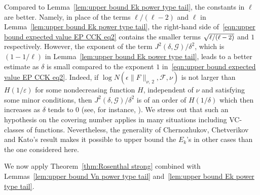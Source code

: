\documentclass[10pt]{amsart}
\theoremstyle{definition}\newtheorem{defi}[theo]{Definition}\newtheorem{rema}[theo]{Remark}\newtheorem{exam}[theo]{Example}\newtheorem{exem}[theo]{Example}\newtheorem{nota}[theo]{Notation}
\newcommand{\cG}{\mathcal{G}}
\newcommand{\caF}{\mathscr{F}}
\begin{document}
Compared to Lemma~\ref{lem:upper bound Ek power type tail}, the constants in $\ell$ are better. Namely, in place of the terms $\ell/(\ell-2)$ and $\ell$ in Lemma~\ref{lem:upper bound Ek power type tail}, the right-hand side of~\eqref{eqn:upper bound expected value EP CCK eq2} contains the smaller terms $\sqrt{\text{\small{$\ell/(\ell-2)$}}}$ and $1$ respectively. However, the exponent of the term $J^2(\delta,\cG)/\delta^2$, which is $(1-1/\ell)$ in Lemma~\ref{lem:upper bound Ek power type tail}, leads to a better estimate as $\delta$ is small compared to the exponent $1$ in~\eqref{eqn:upper bound expected value EP CCK eq2}. Indeed, if $\log N(\epsilon\|F\|_{\nu,\,2},\caF, \nu)$ is not larger than $H(1/\varepsilon)$ for some nondecreasing function $H$, independent of $\nu$ and satisfying some minor conditions, then $J^2(\delta,\cG)/\delta^2$ is of an order of $H(1/\delta)$ which then increases as $\delta$ tends to $0$ (see, for instance, \cite[Theorem~3.5.6]{GN16}). We stress out that such an hypothesis on the covering number applies in many situations including VC-classes of functions. Nevertheless, the generality of Chernozhukov, Chetverikov and Kato's result makes it possible to upper bound the $E_k$'s in other cases than the one considered here.

We now apply Theorem~\ref{thm:Rosenthal strong} combined with Lemmas~\ref{lem:upper bound Vn power type tail} and~\ref{lem:upper bound Ek power type tail}.
\end{document}
